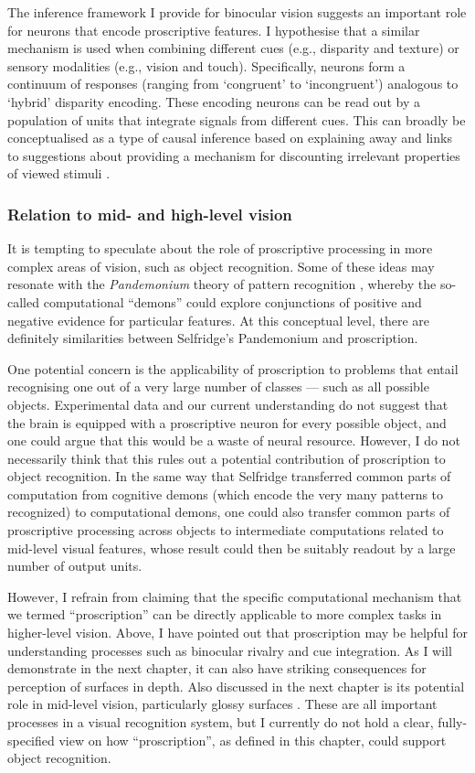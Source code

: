 The inference framework I provide for binocular vision suggests an important role for neurons that encode proscriptive features. I hypothesise that a similar mechanism is used when combining different cues (e.g., disparity and texture) or sensory modalities (e.g., vision and touch). Specifically, neurons form a continuum of responses (ranging from `congruent' to `incongruent') analogous to `hybrid' disparity encoding. These encoding neurons can be read out by a population of units that integrate signals from different cues. This can broadly be conceptualised as a type of causal inference based on explaining away \cite {Wellman:1993el} and links to suggestions about providing a mechanism for discounting irrelevant properties of viewed stimuli \cite{Kim:2016hd}.

\subsubsection*{Relation to mid- and high-level vision}

It is tempting to speculate about the role of proscriptive processing in more complex areas of vision, such as object recognition. Some of these ideas may resonate with the {\it Pandemonium} theory of pattern recognition \cite{selfridge:59}, whereby the so-called computational ``demons'' could explore conjunctions of positive and negative evidence for particular features. At this conceptual level, there are definitely similarities between Selfridge's Pandemonium and proscription.

One potential concern is the applicability of proscription to problems that entail recognising one out of a very large number of classes --- such as all possible objects. Experimental data and our current understanding do not suggest that the brain is equipped with a proscriptive neuron for every possible object, and one could argue that this would be a waste of neural resource. However, I do not necessarily think that this rules out a potential contribution of proscription to object recognition. In the same way that Selfridge transferred common parts of computation from cognitive demons (which encode the very many patterns to recognized) to computational demons, one could also transfer common parts of proscriptive processing across objects to intermediate computations related to mid-level visual features, whose result could then be suitably readout by a large number of output units.

However, I refrain from claiming that the specific computational mechanism that we termed ``proscription'' can be directly applicable to more complex tasks in higher-level vision. Above, I have pointed out that proscription may be helpful for understanding processes such as binocular rivalry and cue integration. As I will demonstrate in the next chapter, it can also have striking consequences for perception of surfaces in depth. Also discussed in the next chapter is its potential role in mid-level vision, particularly glossy surfaces \cite{Muryy:2016km}. These are all important processes in a visual recognition system, but I currently do not hold a clear, fully-specified view on how ``proscription'', as defined in this chapter, could support object recognition.



